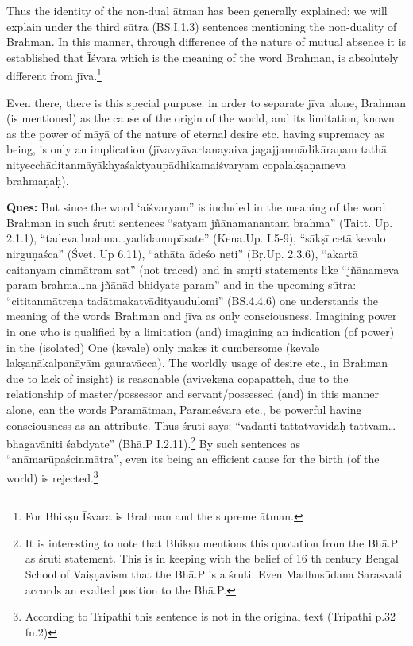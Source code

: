 Thus the identity of the non-dual ātman has been generally explained; we will explain under the third sūtra (BS.I.1.3) sentences mentioning the non-duality of Brahman. In this manner, through difference of the nature of mutual absence it is established that Īśvara which is the meaning of the word Brahman, is absolutely different from jīva.\footnote{For Bhikṣu Īśvara is Brahman and the supreme ātman.} 

Even there, there is this special purpose: in order to separate jīva alone, Brahman (is mentioned) as the cause of the origin of the world, and its limitation, known as the power of māyā of the nature of eternal desire etc. having supremacy as being, is only an implication (jīvavyāvartanayaiva jagajjanmādikāraṇam tathā nityecchāditanmāyākhyaśak\-\break\hbox{tyau\-pādhikamaiśvaryam} copalakṣaṇameva brahmaṇaḥ).

\textbf{Ques:} But since the word ‘aiśvaryam” is included in the meaning of the word Brahman in such śruti sentences “satyam jñānamanantam brahma” (Taitt. Up. 2.1.1), “tadeva brahma…yadidamupāsate”  (Kena.\break Up. I.5-9), “sākṣī cetā kevalo nirguṇaśca” (Śvet. Up 6.11), “athāta ādeśo neti” (Bṛ.Up. 2.3.6), “akartā caitanyam cinmātram sat” (not traced) and in smṛti statements like “jñānameva param brahma…na jñānād bhidyate param” and in the upcoming sūtra: “cititanmātreṇa tadātmakatvādityaudulomi” (BS.4.4.6) one understands the meaning of the words Brahman and jīva as only consciousness. Imagining power in one who  is qualified by a limitation (and) imagining an indication (of power) in the (isolated) One (kevale) only makes it cumbersome (kevale lakṣaṇākalpanāyām gauravācca). The worldly usage of desire etc., in Brahman due to lack of insight) is reasonable (avivekena copapatteḥ, due to the relationship of master/possessor and servant/possessed (and) in this manner alone, can the words Paramātman, Parameśvara etc., be powerful having consciousness as an attribute. Thus śruti says: “vadanti tattatvavidaḥ tattvam…bhagavāniti śabdyate” (Bhā.P I.2.11).\footnote{It is interesting to note that Bhikṣu mentions this quotation from the Bhā.P as śruti statement. This is in keeping with the belief of 16 th century Bengal School of Vaiṣṇavism that the Bhā.P is a śruti. Even Madhusūdana Sarasvati accords an exalted position to the Bhā.P.} By such sentences as “anāmarūpaścinmātra”, even its being an efficient cause for the birth (of the world) is rejected.\footnote{According to Tripathi this sentence is not in the original text (Tripathi p.32 fn.2)} 

